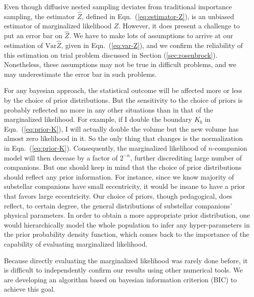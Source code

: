 \documentclass[letterpaper, preprint]{aastex}
\newcommand{\var}{\mathrm{Var}}
\begin{document}
Even though diffusive nested sampling deviates from traditional importance sampling, the estimator $\widehat{Z}$, defined in Eqn.~(\ref{eq:estimator-Z}), is an unbiased estimator of marginalized likelihood $Z$. However, it does present a challenge to put an error bar on $\widehat{Z}$. We have to make lots of assumptions to arrive at our estimation of $\var \widehat{Z}$, given in Eqn.~(\ref{eq:var-Z}), and we confirm the reliability of this estimation on trial problem discussed in Section (\ref{sec:rosenbrock}). Nonetheless, these assumptions may not be true in difficult problems, and we may underestimate the error bar in such problems.

For any bayesian approach, the statistical outcome will be affected more or less by the choice of prior distributions. But the sensitivity to the choice of priors is probably reflected no more in any other situations than in that of the marginalized likelihood. For example, if I double the boundary $K_b$ in Eqn.~(\ref{eq:prior-K}), I will actually double the volume but the new volume has almost zero likelihood in it. So the only thing that changes is the normalization in Eqn.~(\ref{eq:prior-K}). Consequently, the marginalized likelihood of $n$-companion model will then decease by a factor of $2^{-n}$, further discrediting large number of companions. But one should keep in mind that the choice of prior distributions should reflect any prior information. For instance, since we know majority of substellar companions have small eccentricity, it would be insane to have a prior that favors large eccentricity. Our choice of priors, though pedagogical, does reflect, to certain degree, the general distributions of substellar companions' physical parameters. In order to obtain a more appropriate prior distribution, one would hierarchically model the whole population to infer any hyper-parameters in the prior probability density function, which comes back to the importance of the capability of evaluating marginalized likelihood.

Because directly evaluating the marginalized likelihood was rarely done before, it is difficult to independently confirm our results using other numerical tools. We are developing an algorithm based on bayesian information criterion (BIC) to achieve this goal.
\end{document}
